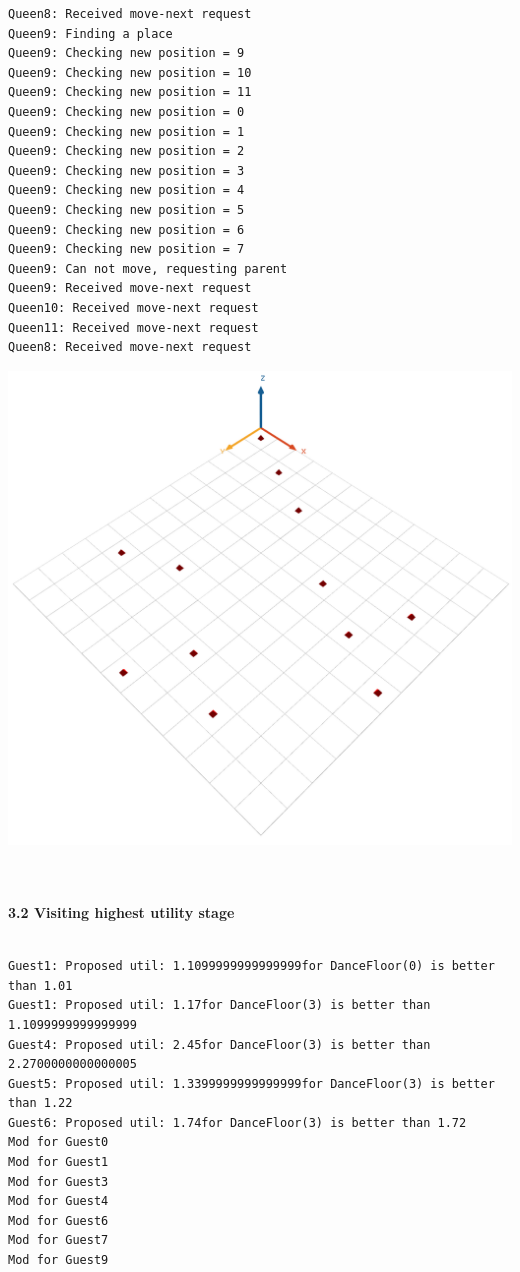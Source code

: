 \documentclass[a4paper,10pt]{article}
\begin{document}
\begin{verbatim}
Queen8: Received move-next request
Queen9: Finding a place
Queen9: Checking new position = 9
Queen9: Checking new position = 10
Queen9: Checking new position = 11
Queen9: Checking new position = 0
Queen9: Checking new position = 1
Queen9: Checking new position = 2
Queen9: Checking new position = 3
Queen9: Checking new position = 4
Queen9: Checking new position = 5
Queen9: Checking new position = 6
Queen9: Checking new position = 7
Queen9: Can not move, requesting parent
Queen9: Received move-next request
Queen10: Received move-next request
Queen11: Received move-next request
Queen8: Received move-next request
\end{verbatim}

\begin{center}{}
\centering\includegraphics[scale=0.3]{Queen.png}\par
\end{center}

\clearpage
\maketitle
\textbf
{\\\\3.2 Visiting highest utility stage\\\\}

\begin{verbatim}
Guest1: Proposed util: 1.1099999999999999for DanceFloor(0) is better than 1.01
Guest1: Proposed util: 1.17for DanceFloor(3) is better than 1.1099999999999999
Guest4: Proposed util: 2.45for DanceFloor(3) is better than 2.2700000000000005
Guest5: Proposed util: 1.3399999999999999for DanceFloor(3) is better than 1.22
Guest6: Proposed util: 1.74for DanceFloor(3) is better than 1.72
Mod for Guest0
Mod for Guest1
Mod for Guest3
Mod for Guest4
Mod for Guest6
Mod for Guest7
Mod for Guest9
\end{verbatim}
\end{document}
